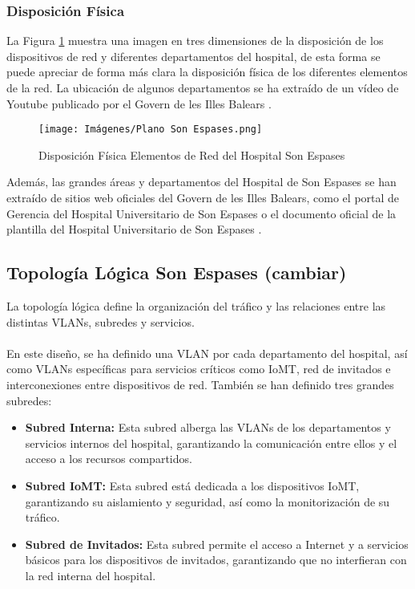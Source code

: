 \subsubsection{Disposición Física}
\label{subsubsec:disposicion}
La Figura \ref{fig:disposicion} muestra una imagen en tres dimensiones de la disposición de los dispositivos de red y diferentes departamentos del hospital, de esta forma se puede apreciar 
de forma más clara la disposición física de los diferentes elementos de la red. La ubicación de algunos departamentos se ha extraído de un vídeo de Youtube publicado por el Govern de les Illes Balears \cite{SonEspases}.
\begin{figure}[H]
    \centering
    \texttt{[image: Imágenes/Plano Son Espases.png]}
    \caption{Disposición Física Elementos de Red del Hospital Son Espases}
    \label{fig:disposicion}
\end{figure}
Además, las grandes áreas y departamentos del Hospital de Son Espases se han extraído de sitios web oficiales del Govern de les Illes Balears, como el portal de Gerencia del Hospital Universitario de Son Espases 
\cite{GerenciaSonEspases} o el documento oficial de la plantilla del Hospital Universitario de Son Espases \cite{PlantillaSonEspases}.

\subsection{Topología Lógica Son Espases (cambiar)}

La topología lógica define la organización del tráfico y las relaciones entre las distintas VLANs, subredes y servicios.
\\ \\
En este diseño, se ha definido una VLAN por cada departamento del hospital, así como VLANs específicas para servicios críticos como IoMT, red de invitados e interconexiones entre dispositivos de red. También se han definido tres grandes subredes:
\begin{itemize}
    \item \textbf{Subred Interna:} Esta subred alberga las VLANs de los departamentos y servicios internos del hospital, garantizando la comunicación entre ellos y el acceso a los recursos compartidos.
    \item \textbf{Subred IoMT:} Esta subred está dedicada a los dispositivos IoMT, garantizando su aislamiento y seguridad, así como la monitorización de su tráfico.
    \item \textbf{Subred de Invitados:} Esta subred permite el acceso a Internet y a servicios básicos para los dispositivos de invitados, garantizando que no interfieran con la red interna del hospital.
\end{itemize}

